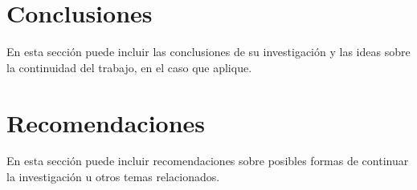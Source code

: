 \documentclass[a4paper,10pt,twocolumn]{article}
\begin{document}



\section{Conclusiones}\label{sec:conc}

  En esta sección puede incluir las conclusiones de su investigación y las ideas
  sobre la continuidad del trabajo, en el caso que aplique.




\section{Recomendaciones}\label{sec:rec}

  En esta sección puede incluir recomendaciones sobre posibles formas de continuar
  la investigación u otros temas relacionados.








\label{end}
\end{document}
